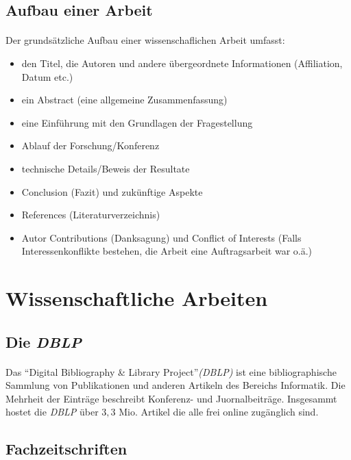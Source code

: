 \documentclass[10pt, a4paper]{article}
\begin{document}
\subsection{Aufbau einer Arbeit}
\paragraph{}
Der grundsätzliche Aufbau einer wissenschaflichen Arbeit umfasst:
\begin{itemize}
\item den Titel, die Autoren und andere übergeordnete Informationen (Affiliation, Datum etc.)
\item ein Abstract (eine allgemeine Zusammenfassung)
\item eine Einführung mit den Grundlagen der Fragestellung
\item Ablauf der Forschung/Konferenz
\item technische Details/Beweis der Resultate
\item Conclusion (Fazit) und zukünftige Aspekte
\item References (Literaturverzeichnis)
\item Autor Contributions (Danksagung) und Conflict of Interests (Falls Interessenkonflikte bestehen, die Arbeit eine Auftragsarbeit war o.ä.)
\end{itemize}
\par

\section{Wissenschaftliche Arbeiten}
\subsection{Die \textit{DBLP}}
\paragraph{}
Das \enquote{Digital Bibliography \& Library Project}\textit{(DBLP)} ist eine bibliographische Sammlung von Publikationen und anderen Artikeln des Bereichs Informatik. Die Mehrheit der Einträge beschreibt Konferenz- und Juornalbeiträge. Insgesammt hostet die \textit{DBLP} über $3,3$ Mio. Artikel die alle frei online zugänglich sind.
\par 

\subsection{Fachzeitschriften}
\end{document}
